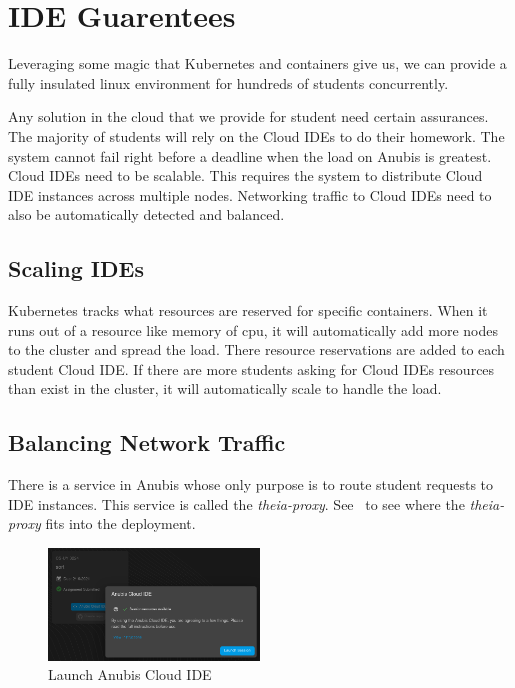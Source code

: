 \section{IDE Guarentees}

Leveraging some magic that Kubernetes and containers give us,
we can provide a fully insulated linux environment for hundreds of
students concurrently.

Any solution in the cloud that we provide for student need certain assurances.
The majority of students will rely on the Cloud IDEs to do their homework.
The system cannot fail right before a deadline when the load on Anubis is greatest.
Cloud IDEs need to be scalable.
This requires the system to distribute Cloud IDE instances across multiple nodes. 
Networking traffic to Cloud IDEs need to also be automatically detected and balanced.

\subsection{Scaling IDEs}

Kubernetes tracks what resources are reserved for specific containers.
When it runs out of a resource like memory of cpu, it will automatically
add more nodes to the cluster and spread the load.
There resource reservations are added to each student Cloud IDE.
If there are more students asking for Cloud IDEs resources than exist
in the cluster, it will automatically scale to handle the load.

\subsection{Balancing Network Traffic}

There is a service in Anubis whose only purpose is to route
student requests to IDE instances. 
This service is called the \textit{theia-proxy}. 
See~ to see where the \textit{theia-proxy}
fits into the deployment.

\begin{figure}
    \centering
    \includegraphics[width=0.5\textwidth]{figures/theia1.png}
    \caption{Launch Anubis Cloud IDE\label{fig:theia1}}
\end{figure}


